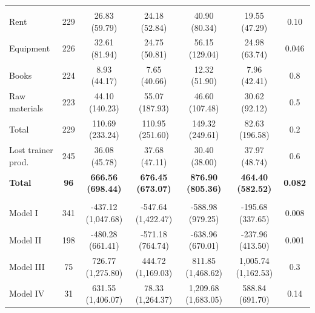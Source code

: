 \documentclass[
  11pt,
a4paper
]{report}
\begin{document}
\begin{table}[H]
{\begin{threeparttable}
\begin{tabular}[t]{lcccccc}
\addlinespace[0.3em]
\multicolumn{7}{l}{\hspace{1em} Training costs}\\
\hspace{1em}\hspace{1em}Rent & 229 & 26.83 (59.79) & 24.18 (52.84) & 40.90 (80.34) & 19.55 (47.29) & 0.10\\
\hspace{1em}\hspace{1em}Equipment & 226 & 32.61 (81.94) & 24.75 (50.81) & 56.15 (129.04) & 24.98 (63.74) & 0.046\\
\hspace{1em}\hspace{1em}Books & 224 & 8.93 (44.17) & 7.65 (40.66) & 12.32 (51.90) & 7.96 (42.41) & 0.8\\
\hspace{1em}\hspace{1em}Raw materials & 223 & 44.10 (140.23) & 55.07 (187.93) & 46.60 (107.48) & 30.62 (92.12) & 0.5\\
\hspace{1em}\hspace{1em}Total & 229 & 110.69 (233.24) & 110.95 (251.60) & 149.32 (249.61) & 82.63 (196.58) & 0.2\\
\hspace{1em}Lost trainer prod. & 245 & 36.08 (45.78) & 37.68 (47.11) & 30.40 (38.00) & 37.97 (48.74) & 0.6\\
\textbf{\hspace{1em}Total} & \textbf{96} & \textbf{666.56 (698.44)} & \textbf{676.45 (673.07)} & \textbf{876.90 (805.36)} & \textbf{464.40 (582.52)} & \textbf{0.082}\\
\addlinespace[0.3em]
\hline
\multicolumn{7}{l}{\textbf{Net Benefits}}\\
\hspace{1em}Model I & 341 & -437.12 (1,047.68) & -547.64 (1,422.47) & -588.98 (979.25) & -195.68 (337.65) & 0.008\\
\hspace{1em}Model II & 198 & -480.28 (661.41) & -571.18 (764.74) & -638.96 (670.01) & -237.96 (413.50) & 0.001\\
\hspace{1em}Model III & 75 & 726.77 (1,275.80) & 444.72 (1,169.03) & 811.85 (1,468.62) & 1,005.74 (1,162.53) & 0.3\\
\hspace{1em}Model IV & 31 & 631.55 (1,406.07) & 78.33 (1,264.37) & 1,209.68 (1,683.05) & 588.84 (691.70) & 0.14\\

\end{tabular}
\end{threeparttable}}
\end{table}
\end{document}
